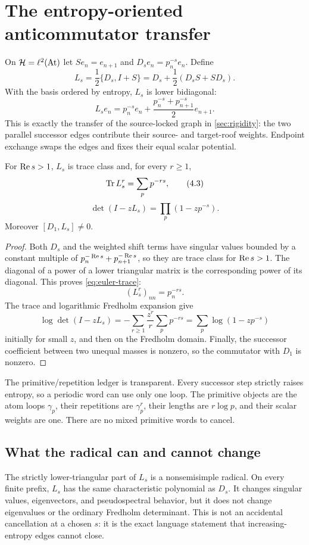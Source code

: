 \section{The entropy-oriented anticommutator transfer}
\label{sec:coupling}

On $\mathcal H=\ell^2(\operatorname{At})$ let $S e_n=e_{n+1}$ and
$D_se_n=p_n^{-s}e_n$.  Define
\[
 L_s=\frac12\{D_s,I+S\}
     =D_s+\frac12(D_sS+SD_s).                \tag{4.1}
\]
With the basis ordered by entropy, $L_s$ is lower bidiagonal:
\[
 L_se_n=p_n^{-s}e_n+
 \frac{p_n^{-s}+p_{n+1}^{-s}}2e_{n+1}.       \tag{4.2}
\]
This is exactly the transfer of the source-locked graph in
\cref{sec:rigidity}: the two parallel successor edges contribute their
source- and target-roof weights.  Endpoint exchange swaps the edges and
fixes their equal scalar potential.

\begin{theorem}
\label{thm:euler-ledger}
For $\operatorname{Re} s>1$, $L_s$ is trace class and, for every $r\ge1$,
\[
 \operatorname{Tr} L_s^r=\sum_p p^{-rs},                    \tag{4.3}
\]
\[
 \det(I-zL_s)=\prod_p(1-zp^{-s}).             \tag{4.4}
\]
Moreover $[D_1,L_s]\ne0$.
\end{theorem}

\begin{proof}
Both $D_s$ and the weighted shift terms have singular values bounded by a
constant multiple of $p_n^{-\operatorname{Re} s}+p_{n+1}^{-\operatorname{Re} s}$, so they are
trace class for $\operatorname{Re} s>1$.  The diagonal of a power of a lower
triangular matrix is the corresponding power of its diagonal.  This proves
\cref{eq:euler-trace}:
\begin{equation}
 (L_s^r)_{nn}=p_n^{-rs}.
 \label{eq:euler-trace}
\end{equation}
The trace and logarithmic Fredholm expansion give
\[
 \log\det(I-zL_s)
 =-\sum_{r\ge1}\frac{z^r}{r}\sum_pp^{-rs}
 =\sum_p\log(1-zp^{-s})
\]
initially for small $z$, and then on the Fredholm domain.  Finally, the
successor coefficient between two unequal masses is nonzero, so the
commutator with $D_1$ is nonzero.
\end{proof}

The primitive/repetition ledger is transparent.  Every successor step
strictly raises entropy, so a periodic word can use only one loop.  The
primitive objects are the atom loops $\gamma_p$, their repetitions are
$\gamma_p^r$, their lengths are $r\log p$, and their scalar weights are one.
There are no mixed primitive words to cancel.

\subsection{What the radical can and cannot change}

The strictly lower-triangular part of $L_s$ is a nonsemisimple radical.  On
every finite prefix, $L_s$ has the same characteristic polynomial as $D_s$.
It changes singular values, eigenvectors, and pseudospectral behavior, but it
does not change eigenvalues or the ordinary Fredholm determinant.  This is
not an accidental cancellation at a chosen $s$: it is the exact language
statement that increasing-entropy edges cannot close.
